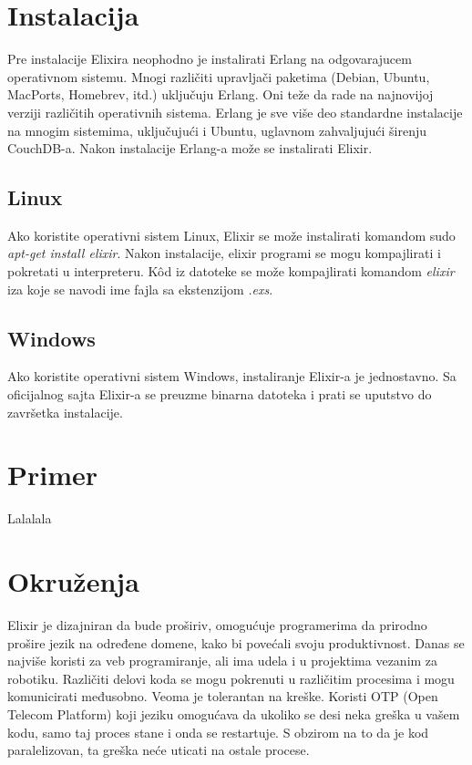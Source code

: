 \documentclass[a4paper]{article}
\begin{document}
\section{Instalacija}
Pre instalacije Elixira neophodno je instalirati Erlang na odgovarajucem operativnom sistemu. Mnogi različiti upravljači paketima (Debian, Ubuntu, MacPorts, Homebrev, itd.) uključuju Erlang.  Oni teže da rade na najnovijoj verziji različitih operativnih sistema. Erlang je sve više deo standardne instalacije na mnogim sistemima, uključujući i Ubuntu, uglavnom zahvaljujući širenju CouchDB-a. Nakon instalacije Erlang-a može se instalirati Elixir. 
\subsection{Linux}    
Ako koristite operativni sistem Linux, Elixir se može instalirati komandom sudo {\em apt-get install elixir}. Nakon instalacije, elixir programi se mogu kompajlirati i pokretati u interpreteru. Kôd iz datoteke se može kompajlirati komandom {\em elixir} iza koje se navodi ime fajla sa ekstenzijom {\em .exs}.
\subsection{Windows}    
Ako koristite operativni sistem Windows, instaliranje Elixir-a je jednostavno. Sa oficijalnog sajta Elixir-a se preuzme binarna datoteka i prati se uputstvo do završetka instalacije. 
\section{Primer}
Lalalala

\section{Okruženja} 
Elixir je dizajniran da bude proširiv, omogućuje programerima da prirodno prošire jezik na određene domene, kako bi povećali svoju produktivnost. Danas se najviše koristi za veb programiranje, ali ima udela i u projektima vezanim za robotiku. Različiti delovi koda se mogu pokrenuti u različitim procesima i mogu komunicirati međusobno. Veoma je tolerantan na kreške. Koristi OTP (Open Telecom Platform) koji jeziku omogućava da ukoliko se desi neka greška u vašem kodu, samo taj proces stane i onda se restartuje. S obzirom na to da je kod paralelizovan, ta greška neće uticati na ostale procese.
\end{document}
